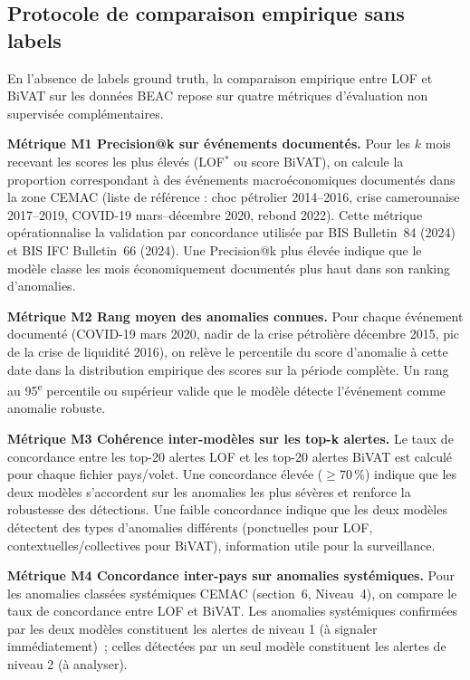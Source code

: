 \documentclass[12pt,a4paper]{article}
\begin{document}
\subsection{Protocole de comparaison empirique sans labels}

En l'absence de labels ground truth, la comparaison empirique entre LOF et
BiVAT sur les données BEAC repose sur quatre métriques d'évaluation non
supervisée complémentaires.

\textbf{Métrique M1  Precision@k sur événements documentés.}
Pour les $k$ mois recevant les scores les plus élevés (LOF$^*$ ou score BiVAT),
on calcule la proportion correspondant à des événements macroéconomiques
documentés dans la zone CEMAC (liste de référence : choc pétrolier
2014--2016, crise camerounaise 2017--2019, COVID-19 mars--décembre 2020,
rebond 2022). Cette métrique opérationnalise la validation par concordance
utilisée par BIS Bulletin~84 (2024) et BIS IFC Bulletin~66 (2024). Une
Precision@k plus élevée indique que le modèle classe les mois économiquement
documentés plus haut dans son ranking d'anomalies.

\textbf{Métrique M2  Rang moyen des anomalies connues.}
Pour chaque événement documenté (COVID-19 mars 2020, nadir de la crise
pétrolière décembre 2015, pic de la crise de liquidité 2016), on relève le
percentile du score d'anomalie à cette date dans la distribution empirique
des scores sur la période complète. Un rang au 95\textsuperscript{e} percentile
ou supérieur valide que le modèle détecte l'événement comme anomalie robuste.

\textbf{Métrique M3  Cohérence inter-modèles sur les top-k alertes.}
Le taux de concordance entre les top-20 alertes LOF et les top-20 alertes
BiVAT est calculé pour chaque fichier pays/volet. Une concordance élevée
($\geq 70\,\%$) indique que les deux modèles s'accordent sur les anomalies
les plus sévères et renforce la robustesse des détections. Une faible
concordance indique que les deux modèles détectent des types d'anomalies
différents (ponctuelles pour LOF, contextuelles/collectives pour BiVAT),
information utile pour la surveillance.

\textbf{Métrique M4  Concordance inter-pays sur anomalies systémiques.}
Pour les anomalies classées systémiques CEMAC (section~6, Niveau~4), on
compare le taux de concordance entre LOF et BiVAT. Les anomalies systémiques
confirmées par les deux modèles constituent les alertes de niveau 1 (à
signaler immédiatement)~; celles détectées par un seul modèle constituent
les alertes de niveau 2 (à analyser).
\end{document}

